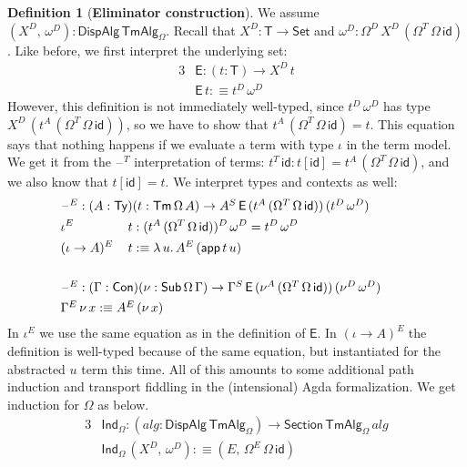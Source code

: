 \documentclass[12pt,a4paper,twoside,openany]{book}
\theoremstyle{remark}
\theoremstyle{definition}
\newtheorem{mydefinition}{Definition}
\theoremstyle{theorem}
\newcommand{\mi}[1]{\mathit{#1}}
\newcommand{\ms}[1]{\mathsf{#1}}
\newcommand{\id}{\mathsf{id}}
\newcommand{\Con}{\mathsf{Con}}
\newcommand{\Sub}{\mathsf{Sub}}
\newcommand{\Tm}{\mathsf{Tm}}
\newcommand{\Ty}{\mathsf{Ty}}
\newcommand{\blank}{\mathord{\hspace{1pt}\text{--}\hspace{1pt}}}
\newcommand{\Set}{\mathsf{Set}}
\newcommand{\app}{\ms{app}}
\newcommand{\DispAlg}{\ms{DispAlg}}
\newcommand{\Section}{\ms{Section}}
\newcommand{\TmAlg}{\ms{TmAlg}}
\newcommand{\Ind}{\ms{Ind}}
\newcommand{\defn}{:\equiv}
\begin{document}
\begin{mydefinition}[\textbf{Eliminator construction}]\label{def:simple-eliminator-construction}
We assume $(X^D,\,\omega^D) : \DispAlg\,\TmAlg_\Omega$. Recall that $X^D :
\ms{T} \to \Set$ and $\omega^D : \Omega^D\,X^D\,(\Omega^T\,\Omega\,\id)$. Like
before, we first interpret the underlying set:
\begin{alignat*}{3}
  & \ms{E} : (t : \ms{T}) \to X^D\,t \\
  & \ms{E}\,t \defn t^D\,\omega^D
\end{alignat*}
However, this definition is not immediately well-typed, since $t^D\,\omega^D$
has type $X^D\,(t^A\,(\Omega^T\,\Omega\,\id))$, so we have to show that
$t^A\,(\Omega^T\,\Omega\,\id) = t$. This equation says that nothing happens if
we evaluate a term with type $\iota$ in the term model. We get it from the
$\blank^T$ interpretation of terms: $t^T\,\id : t[\id] =
t^A\,(\Omega^T\,\Omega\,\id)$, and we also know that $t[\id] = t$. We interpret types
and contexts as well:
\begin{alignat*}{3}
  & \hspace{-8em}\rlap{$\blank^E : (A : \Ty)(t : \Tm\,\Omega\,A) \to A^S\,\ms{E}\,(t^A\,(\Omega^T\,\Omega\,\id))\,(t^D\,\omega^D)$}\\
  & \hspace{-8em}\iota^E\,&&t : (t^A\,(\Omega^T\,\Omega\,\id))^D\,\omega^D = t^D\,\omega^D\\
  & \hspace{-8em}(\iota\to A)^E\,&&t \defn \lambda\,u.\, A^E\,(\app\,t\,u)\\
  & \hspace{-8em}&& \\
  & \hspace{-8em}\rlap{$\blank^E : (\Gamma : \Con)(\nu : \Sub\,\Omega\,\Gamma) \to \Gamma^S\,\ms{E}\,(\nu^A\,(\Omega^T\,\Omega\,\id))\, (\nu^D\,\omega^D)$}\\
  & \hspace{-8em}\rlap{$\Gamma^E\,\nu\,x \defn A^E\,(\nu\,x)$}
\end{alignat*}
In $\iota^E$ we use the same equation as in the definition of $\ms{E}$. In
$(\iota\to A)^E$ the definition is well-typed because of the same equation, but
instantiated for the abstracted $u$ term this time. All of this amounts to some
additional path induction and transport fiddling in the (intensional) Agda
formalization. We get induction for $\Omega$ as below.
\begin{alignat*}{3}
  &\Ind_{\Omega} : (\mi{alg} : \DispAlg\,\TmAlg_\Omega) \to \Section\,\TmAlg_\Omega\,\mi{alg}\\
  &\Ind_{\Omega}\,(X^D,\,\omega^D) \defn (E,\, \Omega^E\,\Omega\,\id)
\end{alignat*}
\end{mydefinition}
\end{document}
